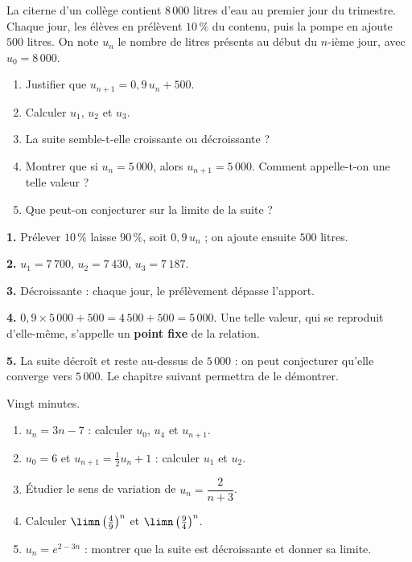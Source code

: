 \begin{situation}
La citerne d'un collège contient $8\,000$ litres d'eau au premier jour du
trimestre. Chaque jour, les élèves en prélèvent $10\,\%$ du contenu, puis la
pompe en ajoute $500$ litres. On note $u_{n}$ le nombre de litres présents
au début du $n$-ième jour, avec $u_{0} = 8\,000$.

\begin{enumerate}[label=\textbf{\arabic*.}, leftmargin=*, itemsep=0.3em]
  \item Justifier que $u_{n+1} = 0{,}9\,u_{n}+500$.
  \item Calculer $u_{1}$, $u_{2}$ et $u_{3}$.
  \item La suite semble-t-elle croissante ou décroissante ?
  \item Montrer que si $u_{n} = 5\,000$, alors $u_{n+1} = 5\,000$.
        Comment appelle-t-on une telle valeur ?
  \item Que peut-on conjecturer sur la limite de la suite ?
\end{enumerate}
\end{situation}

\begin{corrige}
\textbf{1.} Prélever $10\,\%$ laisse $90\,\%$, soit $0{,}9\,u_{n}$ ; on
ajoute ensuite $500$ litres.

\textbf{2.} $u_{1} = 7\,700$, $u_{2} = 7\,430$, $u_{3} = 7\,187$.

\textbf{3.} Décroissante : chaque jour, le prélèvement dépasse l'apport.

\textbf{4.} $0{,}9\times5\,000+500 = 4\,500+500 = 5\,000$. Une telle valeur,
qui se reproduit d'elle-même, s'appelle un \textbf{point fixe} de la
relation.

\textbf{5.} La suite décroît et reste au-dessus de $5\,000$ : on peut
conjecturer qu'elle converge vers $5\,000$. Le chapitre suivant permettra de
le démontrer.
\end{corrige}

\begin{jemeteste}
Vingt minutes.

\begin{enumerate}[label=\textbf{\arabic*.}, leftmargin=*, itemsep=0.3em]
  \item $u_{n} = 3n-7$ : calculer $u_{0}$, $u_{4}$ et $u_{n+1}$.
  \item $u_{0} = 6$ et $u_{n+1} = \frac12u_{n}+1$ : calculer $u_{1}$ et
        $u_{2}$.
  \item Étudier le sens de variation de $u_{n} = \dfrac{2}{n+3}$.
  \item Calculer $\limn \left(\frac49\right)^{n}$ et
        $\limn \left(\frac94\right)^{n}$.
  \item $u_{n} = e^{2-3n}$ : montrer que la suite est décroissante et donner
        sa limite.
\end{enumerate}
\end{jemeteste}

